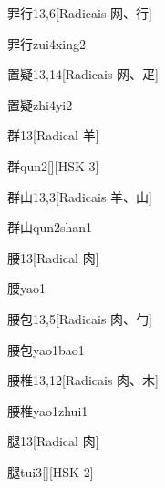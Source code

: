 \begin{entry}{罪行}{13,6}[Radicais ⽹、⾏]
  \begin{phonetics}{罪行}{zui4xing2}
  \end{phonetics}
\end{entry}

\begin{entry}{置疑}{13,14}[Radicais ⽹、⽦]
  \begin{phonetics}{置疑}{zhi4yi2}
  \end{phonetics}
\end{entry}

\begin{entry}{群}{13}[Radical ⽺]
  \begin{phonetics}{群}{qun2}[][HSK 3]
  \end{phonetics}
\end{entry}

\begin{entry}{群山}{13,3}[Radicais ⽺、⼭]
  \begin{phonetics}{群山}{qun2shan1}
  \end{phonetics}
\end{entry}

\begin{entry}{腰}{13}[Radical ⾁]
  \begin{phonetics}{腰}{yao1}
  \end{phonetics}
\end{entry}

\begin{entry}{腰包}{13,5}[Radicais ⾁、⼓]
  \begin{phonetics}{腰包}{yao1bao1}
  \end{phonetics}
\end{entry}

\begin{entry}{腰椎}{13,12}[Radicais ⾁、⽊]
  \begin{phonetics}{腰椎}{yao1zhui1}
  \end{phonetics}
\end{entry}

\begin{entry}{腿}{13}[Radical ⾁]
  \begin{phonetics}{腿}{tui3}[][HSK 2]
  \end{phonetics}
\end{entry}

